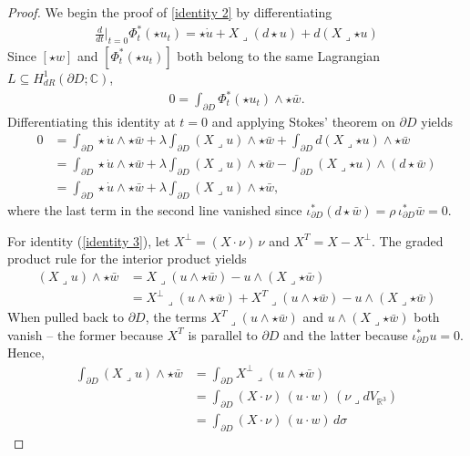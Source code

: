 \documentclass[11pt,reqno]{amsart}
\newcommand{\hodge}{\!\star\!}
\newcommand{\iprod}{\mathbin{\lrcorner}}
\begin{document}
\begin{proof}
We begin the proof of \eqref{identity 2} by differentiating 
\begin{align*}
    \frac{d}{dt}\lvert_{t=0}\Phi_t^\ast (\star u_t)= \star \dot{u} + X\iprod (d\hodge u) + d(X\iprod \star u)
\end{align*}
Since $[\star w]$ and $[\Phi^\ast_t (\star u_t)]$ both belong to the same Lagrangian $L \subseteq H^1_{dR}(\partial D; \mathbb C)$,
\begin{align*}
    0 = \int_{\partial D} \Phi_t^\ast (\star u_t) \wedge \star \bar w.
\end{align*}
Differentiating this identity at $t=0$ and applying Stokes' theorem on $\partial D$ yields
\begin{align*}
    0 &= \int_{\partial D} \star \dot u \wedge \star \bar w+ \lambda \int_{\partial D} (X \iprod u) \wedge \star \bar w  + \int_{\partial D} d ( X \iprod \star u) \wedge \star \bar w  \\
    &= \int_{\partial D} \star \dot u \wedge \star \bar w + \lambda \int_{\partial D} (X \iprod u) \wedge \star \bar w  - \int_{\partial D} (X \iprod \star u) \wedge (d \hodge \bar w)\\
    &= \int_{\partial D} \star \dot u \wedge \star \bar w+ \lambda \int_{\partial D} (X \iprod u) \wedge \star \bar w,
\end{align*}
where the last term in the second line vanished since $\iota_{\partial D}^\ast(d \hodge \bar w) = \rho \, \iota_{\partial D}^\ast \bar w = 0$. 





For identity (\ref{identity 3}), let  $X^\perp = (X\cdot \nu)\, \nu$ and $X^T = X-X^\perp$. The graded product rule for the interior product yields
\begin{align*}
    (X \iprod u) \wedge \star \bar w&= 
    X \iprod (u \wedge \star \bar w) - u \wedge (X \iprod \star \bar w) \\
    &= X^\perp \iprod (u \wedge \star \bar w) + X^T \iprod (u \wedge \star \bar w) - u \wedge (X \iprod \star \bar w)
\end{align*}
When pulled back to $\partial D$, the terms $X^T \iprod ( u \wedge \star \bar w)$ and $u \wedge (X \iprod \star \bar w)$ both vanish -- the former because $X^T$ is parallel to $\partial D$ and the latter because $\iota_{\partial D}^\ast u = 0$. Hence,
\begin{align*}
    \int_{\partial D} (X \iprod u) \wedge \star \bar w & = \int_{\partial D} X^\perp \iprod (u \wedge \star \bar w) \\
    &= \int_{\partial D} (X\cdot \nu)\, ( u \cdot w) \, (\nu \iprod dV_{\mathbb R^3}) \\
    & = \int_{\partial D} (X\cdot \nu)\, ( u \cdot w)\,d\sigma
\end{align*}


\end{proof}
\end{document}
